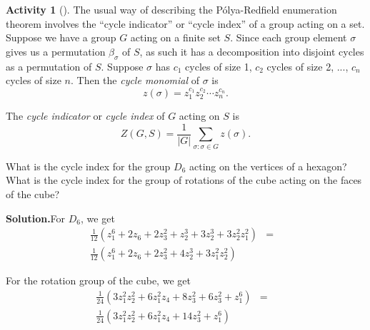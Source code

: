 \documentclass[10pt,]{book}
\theoremstyle{plain}
\theoremstyle{definition}
\newtheorem{activity}[project]{Activity}
\numberwithin{equation}{chapter}
\newcommand{\amp}{&}
\begin{document}
\begin{activity}[]\label{activity-312}
The usual way of describing the Pólya-Redfield enumeration theorem involves the ``cycle indicator'' or ``cycle index'' of a group acting on a set. Suppose we have a group \(G\) acting on a finite set \(S\). Since each group element \(\sigma\) gives us a permutation \(\beta_{\sigma}\) of \(S\), as such it has a decomposition into disjoint cycles as a permutation of \(S\). Suppose \(\sigma\) has \(c_1\) cycles of size 1, \(c_2\) cycles of size 2, ..., \(c_n\) cycles of size \(n\). Then the \emph{cycle monomial} of \(\sigma\) is%
\begin{equation*}
z(\sigma) = z_1^{c_1}z_2^{c_2}\cdots z_n^{c_n}.
\end{equation*}
%
\par
The \emph{cycle indicator} or \emph{cycle index} of \(G\) acting on \(S\) is%
\begin{equation*}
Z(G,S) = \frac{1}{|G|}\sum_{\sigma: \sigma \in G} z(\sigma).
\end{equation*}
%
\par
What is the cycle index for the group \(D_6\) acting on the vertices of a hexagon? What is the cycle index for the group of rotations of the cube acting on the faces of the cube?%
\par\medskip\noindent%
\textbf{Solution.}\quad For \(D_6\), we get%
\begin{align*}
\frac{1}{12}\left(z_1^6
+2z_6+2z_3^2+z_2^3+3z_2^3+3z_2^2z_1^2\right) \amp =\amp\\
\frac{1}{12}\left(z_1^6
+2z_6+2z_3^2+4z_2^3+3z_1^2z_2^2\right)\amp \amp
\end{align*}
%
\par
For the rotation group of the cube, we get%
\begin{align*}
\frac{1}{24}\left(3z_1^2z_2^2+ 6z_1^2z_4+8z_3^2 +6z_3^2+z_1^6\right)\amp =\amp\\
\frac{1}{24}\left(3z_1^2z_2^2+ 6z_1^2z_4 +14z_3^2+z_1^6\right)\amp \amp
\end{align*}
%
\end{activity}
\end{document}
